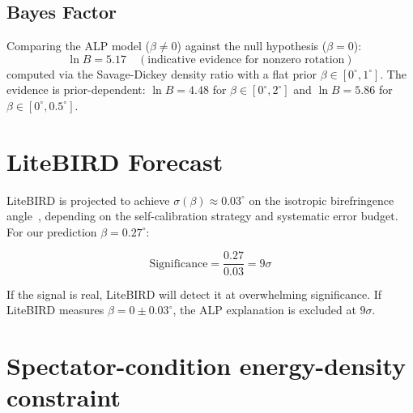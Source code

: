 \documentclass[a4paper,11pt]{article}
\begin{document}
\subsection{Bayes Factor}\label{sec:bayesfactor}

Comparing the ALP model ($\beta \neq 0$) against the null hypothesis ($\beta = 0$):
\begin{equation}\label{eq:bayesfactor}
\ln B = 5.17 \quad (\text{indicative evidence for nonzero rotation})
\end{equation}
computed via the Savage-Dickey density ratio with a flat prior $\beta \in [0^\circ, 1^\circ]$. The evidence is prior-dependent: $\ln B = 4.48$ for $\beta \in [0^\circ, 2^\circ]$ and $\ln B = 5.86$ for $\beta \in [0^\circ, 0.5^\circ]$.

\section{LiteBIRD Forecast}

LiteBIRD is projected to achieve $\sigma(\beta) \approx 0.03^\circ$ on the isotropic birefringence angle~\citep{LiteBIRD2023}, depending on the self-calibration strategy and systematic error budget. For our prediction $\beta = 0.27^\circ$:

\begin{equation}\label{eq:litebird}
\text{Significance} = \frac{0.27}{0.03} = 9\sigma
\end{equation}

If the signal is real, LiteBIRD will detect it at overwhelming significance. If LiteBIRD measures $\beta = 0 \pm 0.03^\circ$, the ALP explanation is excluded at $9\sigma$.

\section{Spectator-condition energy-density constraint}\label{sec:spectator_caveat}
\end{document}
